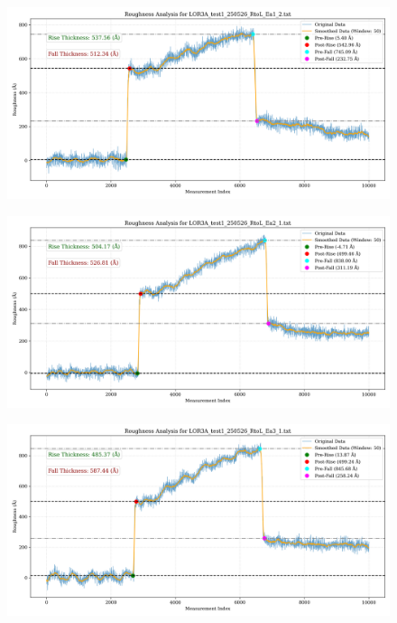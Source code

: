 \documentclass[platex,dvipdfmx,10pt,twoside,a4paper,jis2004]{jsarticle}
\begin{document}
\begin{figure}[H]
    \centering
    \includegraphics[width=\textwidth]{LOR3A_test1_250526_RtoL_Ea1_2.png}
    \label{fig:LOR3Atest1250526RtoLEa12}
\end{figure}
\begin{figure}[H]
    \centering
    \includegraphics[width=\textwidth]{LOR3A_test1_250526_RtoL_Ea2_1.png}
    \label{fig:LOR3Atest1250526RtoLEa21}
\end{figure}
\begin{figure}[H]
    \centering
    \includegraphics[width=\textwidth]{LOR3A_test1_250526_RtoL_Ea3_1.png}
    \label{fig:LOR3Atest1250526RtoLEa31}
\end{figure}
\end{document}

